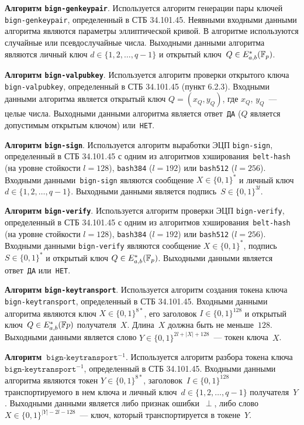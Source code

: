 {\bf Алгоритм \texttt{bign-genkeypair}}.
Используется алгоритм генерации пары ключей 
\texttt{bign-genkeypair}, определенный в СТБ 34.101.45.
Неявными входными данными алгоритма являются параметры эллиптической кривой.
В алгоритме используются случайные или псевдослучайные числа. 
Выходными данными алгоритма являются личный ключ $d\in\{1,2,\ldots,q-1\}$ 
и открытый ключ~$Q\in E_{a,b}^*({\mathbb F}_p)$.

{\bf Алгоритм \texttt{bign-valpubkey}}.
Используется алгоритм проверки открытого ключа 
\texttt{bign-valpubkey}, определенный в СТБ 34.101.45 (пункт 6.2.3). Входными 
данными алгоритма является открытый ключ $Q = (x_Q, y_Q)$, 
где $x_Q$, $y_Q$~--- целые числа. Выходными данными алгоритма является 
ответ~\texttt{ДА} ($Q$ является допустимым открытым ключом) или~\texttt{НЕТ}.

{\bf Алгоритм \texttt{bign-sign}}. Используется алгоритм выработки ЭЦП 
\texttt{bign-sign}, определенный в СТБ 34.101.45 с одним из алгоритмов
хэширования~\texttt{belt-hash} (на уровне стойкости $l=128$),
\texttt{bash384} ($l=192$) или \texttt{bash512} ($l=256$).
%
Входными данными~\texttt{bign-sign} являются сообщение 
$X\in\{0,1\}^*$ и личный ключ~$d\in\{1,2,\ldots,q-1\}$.
Выходными данными является подпись~$S\in\{0,1\}^{3l}$.

{\bf Алгоритм \texttt{bign-verify}}.
Используется алгоритм проверки ЭЦП \texttt{bign-verify}, 
определенный в СТБ 34.101.45 с одним из алгоритмов 
хэширования~\texttt{belt-hash} (на уровне стойкости $l=128$),  
\texttt{bash384} ($l=192$) или \texttt{bash512} ($l=256$). 
Входными данными \texttt{bign-verify} являются сообщение $X\in\{0,1\}^*$, 
подпись $S\in\{0,1\}^*$ и открытый ключ $Q \in E_{a,b}^*({\mathbb F}_p)$.
Выходными данными является ответ~\texttt{ДА} или~\texttt{НЕТ}.

{\bf Алгоритм \texttt{bign-keytransport}}.
Используется алгоритм создания токена ключа 
\texttt{bign-keytransport}, определенный в СТБ 34.101.45.
Входными данными алгоритма являются ключ $X\in\{0,1\}^{8*}$, 
его заголовок $I\in\{0,1\}^{128}$ и открытый ключ~$Q\in E_{a,b}^*({\mathbb F} p)$ 
получателя~$X$. Длина~$X$ должна быть не меньше~$128$.
Выходными данными является слово $Y\in\{0,1\}^{2l+|X|+128}$~--- токен ключа~$X$.
 
{\bf Алгоритм~$\texttt{bign-keytransport}^{-1}$}.
Используется алгоритм разбора токена ключа~$\texttt{bign-keytransport}^{-1}$, 
определенный в СТБ 34.101.45. Входными данными алгоритма являются токен 
$Y\in\{0,1\}^{8*}$, заголовок~$I\in\{0,1\}^{128}$ транспортируемого в нем ключа 
и личный ключ~$d\in\{1,2,\ldots,q-1\}$ получателя~$Y$.
Выходными данными является либо признак ошибки~$\perp$, 
либо слово~$X\in\{0,1\}^{|Y|-2l-128}$~--- ключ, 
который транспортируется в токене~$Y$.

